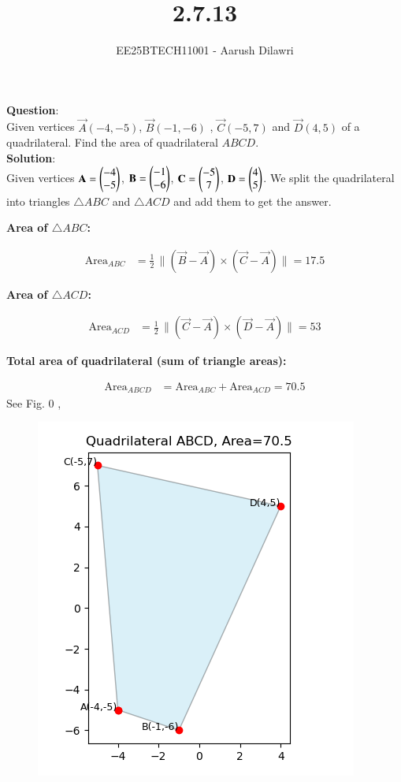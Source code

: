 \documentclass[journal]{IEEEtran}
\begin{document}

\vspace{3cm}

\title{2.7.13}
\author{EE25BTECH11001 - Aarush Dilawri}
{\let\newpage\relax\maketitle}

\renewcommand{\thefigure}{\theenumi}
\renewcommand{\thetable}{\theenumi}
\setlength{\intextsep}{10pt} %
\textbf{Question}:\\
Given vertices $\vec{A}(-4,-5)$, $\vec{B}(-1,-6)$ , $\vec{C}(-5,7)$ and $\vec{D}(4,5)$ of a quadrilateral. Find the area of quadrilateral $ABCD$.\\
\textbf{Solution}:\\


Given vertices $\mathbf{A}=\begin{pmatrix}-4\\-5\end{pmatrix}$, $\mathbf{B}=\begin{pmatrix}-1\\-6\end{pmatrix}$, $\mathbf{C}=\begin{pmatrix}-5\\7\end{pmatrix}$, $\mathbf{D}=\begin{pmatrix}4\\5\end{pmatrix}$.  
We split the quadrilateral into triangles $\triangle ABC$ and $\triangle ACD$ and add them to get the answer.




\textbf{Area of $\triangle ABC$:}

\begin{align}
\text{Area}_{ABC}
&= \tfrac{1}{2}\,\big\lVert (\vec{B}-\vec{A}) \times (\vec{C}-\vec{A}) \big\rVert = 17.5
\end{align}

\textbf{Area of $\triangle ACD$:}

\begin{align}
\text{Area}_{ACD}
&= \tfrac{1}{2}\,\big\lVert (\vec{C}-\vec{A}) \times (\vec{D}-\vec{A}) \big\rVert = 53
\end{align}

\textbf{Total area of quadrilateral (sum of triangle areas):}

\begin{align}
\text{Area}_{ABCD} &= \text{Area}_{ABC} + \text{Area}_{ACD} = 70.5
\end{align}
\newpage
See Fig. 0 ,
\begin{figure}[H]
\begin{center}
\includegraphics[width=0.6\columnwidth]{figs/fig.png}
\end{center}
\caption{}
\label{fig:Fig1}
\end{figure}
\end{document}
